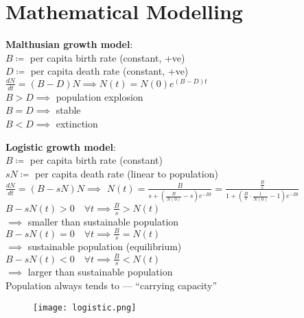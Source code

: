 \documentclass[a4paper,landscape]{article}
\newcommand{\rntopic}[1]{\section*{#1}\vspace{-0.7em}}
\newcommand{\rnname}[1]{\textbf{#1}}
\begin{document}
\begin{multicols*}{3}
\begin{flatitemize}
\end{flatitemize}

\rntopic{Mathematical Modelling}

\begin{flatitemize}

\item \rnname{Malthusian growth model}: \\
$B \coloneqq$ per capita birth rate (constant, +ve) \\
$D \coloneqq$ per capita death rate (constant, +ve) \\
$\displaystyle \frac{dN}{dt}=(B-D)N \implies N(t)=N(0)e^{(B-D)t}$ \\
$B>D \implies$ population explosion \\
$B=D \implies$ stable \\
$B<D \implies$ extinction

\item \rnname{Logistic growth model}: \\
$B \coloneqq$ per capita birth rate (constant) \\
$sN \coloneqq$ per capita death rate (linear to population) \\
$\displaystyle \frac{dN}{dt}=(B-sN)N \implies$ $\displaystyle N(t)=\frac{B}{s+(\frac{B}{N(0)}-s)e^{-Bt}} = \frac{\frac{B}{s}}{1+\left(\frac{B}{s}\cdot\frac{1}{N(0)}-1\right)e^{-Bt}}$ \\
$B-sN(t)>0 \quad\forall t \implies \frac{B}{s}>N(t)$ \\ $\implies$ smaller than sustainable population \\
$B-sN(t)=0 \quad\forall t \implies \frac{B}{s}=N(t)$ \\ $\implies$ sustainable population (equilibrium) \\
$B-sN(t)<0 \quad\forall t \implies \frac{B}{s}<N(t)$ \\ $\implies$ larger than sustainable population \\
Population always tends to  --- ``carrying capacity''

\begin{figure}[H]
  \texttt{[image: logistic.png]}
\end{figure}


\end{flatitemize}
\end{multicols*}
\end{document}

